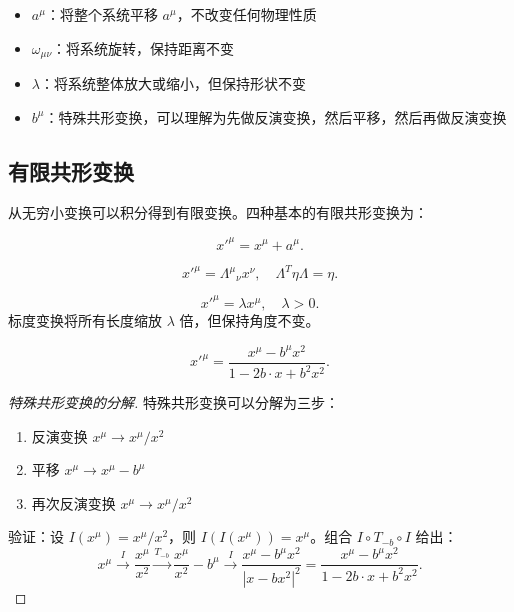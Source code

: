 \begin{example}[各变换的物理意义]
\begin{itemize}
    \item $a^\mu$：将整个系统平移 $a^\mu$，不改变任何物理性质
    \item $\omega_{\mu\nu}$：将系统旋转，保持距离不变
    \item $\lambda$：将系统整体放大或缩小，但保持形状不变
    \item $b^\mu$：特殊共形变换，可以理解为先做反演变换，然后平移，然后再做反演变换
\end{itemize}
\end{example}

\subsection{有限共形变换}

从无穷小变换可以积分得到有限变换。四种基本的有限共形变换为：

\begin{definition}[平移]
\begin{equation}
    x'^\mu = x^\mu + a^\mu.
\end{equation}
\end{definition}

\begin{definition}[旋转]
\begin{equation}
    x'^\mu = {\Lambda^\mu}_\nu x^\nu, \quad \Lambda^T \eta \Lambda = \eta.
\end{equation}
\end{definition}

\begin{definition}[标度变换]
\begin{equation}
    x'^\mu = \lambda x^\mu, \quad \lambda > 0.
\end{equation}
标度变换将所有长度缩放 $\lambda$ 倍，但保持角度不变。
\end{definition}

\begin{definition}[特殊共形变换]
\begin{equation}
    x'^\mu = \frac{x^\mu - b^\mu x^2}{1 - 2b \cdot x + b^2 x^2}.
\end{equation}
\end{definition}

\begin{proof}[特殊共形变换的分解]
特殊共形变换可以分解为三步：
\begin{enumerate}
    \item 反演变换 $x^\mu \to x^\mu/x^2$
    \item 平移 $x^\mu \to x^\mu - b^\mu$
    \item 再次反演变换 $x^\mu \to x^\mu/x^2$
\end{enumerate}
验证：设 $I(x^\mu) = x^\mu/x^2$，则 $I(I(x^\mu)) = x^\mu$。组合 $I \circ T_{-b} \circ I$ 给出：
\begin{equation}
    x^\mu \xrightarrow{I} \frac{x^\mu}{x^2} \xrightarrow{T_{-b}} \frac{x^\mu}{x^2} - b^\mu \xrightarrow{I} \frac{x^\mu - b^\mu x^2}{|x - b x^2|^2} = \frac{x^\mu - b^\mu x^2}{1 - 2b \cdot x + b^2 x^2}.
\end{equation}
\end{proof}


